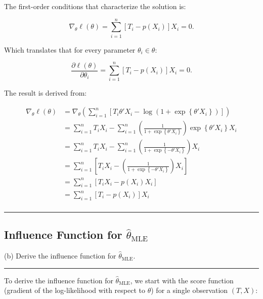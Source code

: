 \documentclass{article}
\newenvironment{colorparagraph}[1]{\par\color{#1}}{\par}
\begin{document}
The first-order conditions that characterize the solution is:

\[
\nabla_{\theta} \ell(\theta) = \sum_{i=1}^n \left[ T_i - p(X_i) \right] X_i = 0.
\]

Which translates that for every parameter $\theta_i \in \theta$: 

\[
\frac{\partial \ell(\theta)}{\partial \theta_i} = \sum_{i=1}^n \left[ T_i - p(X_i) \right] X_i = 0.
\]

The result is derived from:

\begin{align*}
  \nabla_{\theta} \ell(\theta)
  &= \nabla_{\theta} \left(\sum_{i=1}^n
    \left[
      T_i \theta' X_i - \log \left( 1 + \exp\left\{ \theta' X_i \right\} \right)
    \right]
    \right)
    \\
   &= 
   \sum_{i=1}^n
      T_i X_i
      -
    \sum_{i=1}^n
    \left(
      \frac{1}{1 + \exp\left\{ \theta' X_i \right\}}
    \right)
    \exp\left\{ \theta' X_i \right\} X_i
    \\
  &= 
    \sum_{i=1}^n
       T_i X_i
       -
     \sum_{i=1}^n
     \left(
       \frac{1}{1 + \exp\left\{ - \theta' X_i \right\}}
     \right)
     X_i
     \\
  &= 
     \sum_{i=1}^n
     \left[
        T_i X_i
        -
      \left(
        \frac{1}{1 + \exp\left\{ - \theta' X_i \right\}}
      \right)
      X_i
    \right] \\
  &= 
    \sum_{i=1}^n
    \left[
       T_i X_i
       -
     p(X_i)
     X_i
   \right] \\
  &= 
   \sum_{i=1}^n
   \left[
      T_i
      -
    p(X_i)
  \right]
  X_i \\
\end{align*}



\begin{colorparagraph}{questioncolor}
\label{q1b}
\rule{\textwidth}{0.5pt}
\subsection{Influence Function for \( \hat{\theta}_{\text{MLE}} \)}
(b) Derive the influence function for \( \hat{\theta}_{\text{MLE}} \).

\rule{\textwidth}{0.5pt}
\end{colorparagraph}

To derive the influence function for \( \hat{\theta}_{\text{MLE}} \), we start with the score function (gradient of the log-likelihood with respect to $\theta$) for a single observation \( (T, X) \):
\end{document}
